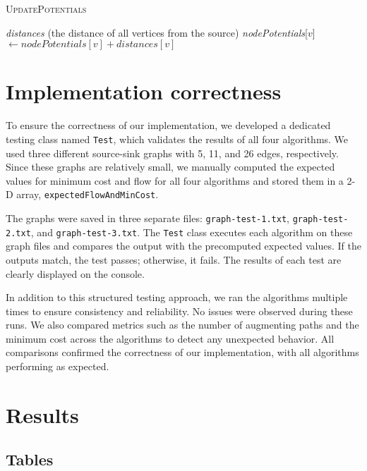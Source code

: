 \documentclass{article}
\begin{document}
\begin{algorithm}[H]
\caption{\textcolor{keywordcolor}{\textsc{UpdatePotentials}}}
\begin{algorithmic}[1]
\State {} \textit{distances} (the distance of all vertices from the source)
        \State \textit{nodePotentials}[$v$] $\gets \textit{nodePotentials}[v] + \textit{distances}[v]$
    \EndIf
\EndFor
\end{algorithmic}
\end{algorithm}

\section{Implementation correctness}

To ensure the correctness of our implementation, we developed a dedicated testing class named \texttt{Test}, which validates the results of all four algorithms. We used three different source-sink graphs with 5, 11, and 26 edges, respectively. Since these graphs are relatively small, we manually computed the expected values for minimum cost and flow for all four algorithms and stored them in a 2-D array, \texttt{expectedFlowAndMinCost}. 

The graphs were saved in three separate files: \texttt{graph-test-1.txt}, \texttt{graph-test-2.txt}, and \texttt{graph-test-3.txt}. The \texttt{Test} class executes each algorithm on these graph files and compares the output with the precomputed expected values. If the outputs match, the test passes; otherwise, it fails. The results of each test are clearly displayed on the console.

In addition to this structured testing approach, we ran the algorithms multiple times to ensure consistency and reliability. No issues were observed during these runs. We also compared metrics such as the number of augmenting paths and the minimum cost across the algorithms to detect any unexpected behavior. All comparisons confirmed the correctness of our implementation, with all algorithms performing as expected.

\section{Results}

\subsection{Tables}
\end{document}
